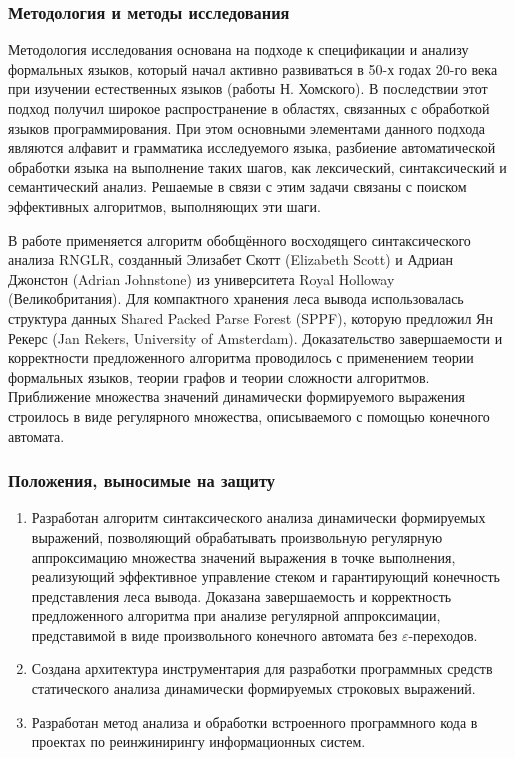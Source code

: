 \subsubsection*{\large{Методология и методы исследования}}

Методология исследования основана на подходе к спецификации и анализу формальных языков, который начал активно развиваться в 50-х годах 20-го века при изучении естественных языков (работы Н. Хомского). В последствии этот подход получил широкое распространение в областях, связанных с обработкой языков программирования.
При этом основными элементами данного подхода являются алфавит и грамматика исследуемого языка, разбиение автоматической обработки языка на выполнение таких шагов, как лексический, синтаксический и семантический анализ. Решаемые в связи с этим задачи связаны с поиском эффективных алгоритмов, выполняющих эти шаги. 

В работе применяется алгоритм обобщённого восходящего синтаксического анализа RNGLR, созданный Элизабет Скотт (Elizabeth Scott) и Адриан Джонстон (Adrian Johnstone) из университета Royal Holloway (Великобритания). Для компактного хранения леса вывода использовалась структура данных Shared Packed Parse Forest (SPPF), которую предложил Ян Рекерс (Jan Rekers, University of Amsterdam). Доказательство завершаемости и корректности предложенного алгоритма проводилось с применением теории формальных языков, теории графов и теории сложности алгоритмов. Приближение множества значений динамически формируемого выражения строилось в виде регулярного множества, описываемого с помощью конечного автомата.

\subsubsection*{\large{Положения, выносимые на защиту}}
\begin{enumerate}
    \item Разработан алгоритм синтаксического анализа динамически формируемых выражений, позволяющий обрабатывать произвольную регулярную аппроксимацию множества значений выражения в точке выполнения, реализующий 
    эффективное управление стеком и гарантирующий конечность представления леса вывода. Доказана завершаемость и корректность предложенного алгоритма при анализе регулярной аппроксимации, представимой в виде произвольного конечного автомата без $\varepsilon$-переходов. 
    \item Создана архитектура инструментария для разработки программных средств статического анализа динамически формируемых строковых выражений.
    \item Разработан метод анализа и обработки встроенного программного кода в проектах по реинжинирингу информационных систем. 
\end{enumerate}


